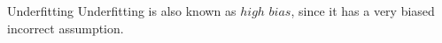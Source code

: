 \documentclass{beamer}
\begin{document}
	\begin{frame}{Underfitting}
	Underfitting is also known as $high$ $bias$, since it has a very biased incorrect assumption.
	\begin{figure}%
	    \centering
	    \qquad
	    \label{fig:example}%
	\end{figure}
	\end{frame}
\end{document}
